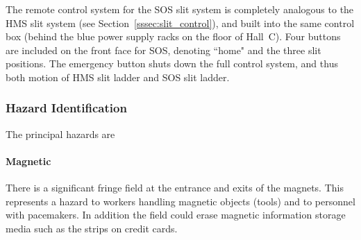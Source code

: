 The remote control system for the SOS slit system is completely analogous
to the HMS slit system (see Section~\ref{sssec:slit_control}),
and built into the same control box
(behind the blue power supply racks on the floor of Hall~C).
Four buttons are included on the front face for SOS, denoting ``home" and
the three slit positions.
The emergency button shuts down the full control system, and thus both motion
of HMS slit ladder and SOS slit ladder.



\subsubsection{Hazard Identification}

The principal hazards are
\paragraph{Magnetic} There is a significant fringe field at
the entrance and exits of the magnets. This represents a hazard
to workers handling magnetic objects (tools) and to personnel with
pacemakers. In addition the field could erase magnetic
information storage media such as the strips on credit cards.
